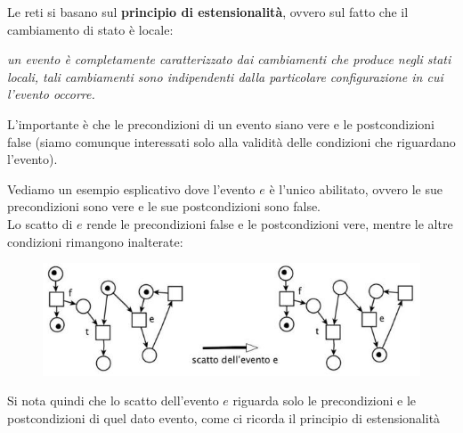 \documentclass[a4paper,12pt, oneside]{book}
\begin{document}
Le reti si basano sul \textbf{principio di estensionalità}, ovvero sul fatto che
il cambiamento di stato è locale:
\begin{center}
  \textit{un evento è completamente caratterizzato dai cambiamenti che produce
    negli stati locali, tali cambiamenti sono indipendenti dalla particolare
    configurazione in cui l’evento occorre.}
\end{center}
L'importante è che le precondizioni di un evento siano vere e le postcondizioni
false (siamo comunque interessati solo alla validità delle condizioni che
riguardano l'evento).
\newpage
\begin{esempio}
  Vediamo un esempio esplicativo dove l’evento $e$ è l'unico abilitato, ovvero
  le sue precondizioni sono vere e le sue postcondizioni sono false.\\
  Lo scatto di $e$ rende le precondizioni false e le postcondizioni vere,
  mentre le altre condizioni rimangono inalterate:
  \begin{figure}[H]
    \centering
    \includegraphics[scale = 0.6]{img/est.jpg}
  \end{figure}
  Si nota quindi che lo scatto dell'evento $e$ riguarda solo le precondizioni e
  le postcondizioni di quel dato evento, come ci ricorda il principio di
  estensionalità 
\end{esempio}
\end{document}
